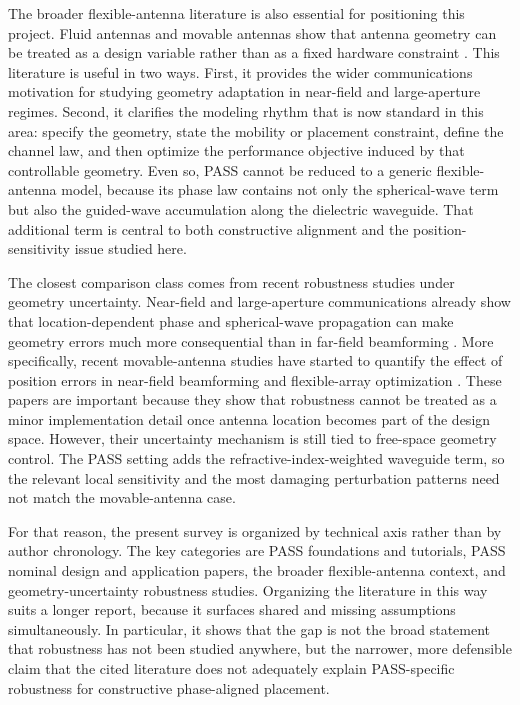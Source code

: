 The broader flexible-antenna literature is also essential for positioning this project. Fluid antennas and movable antennas show that antenna geometry can be treated as a design variable rather than as a fixed hardware constraint \cite{wong2021fluid,zhu2024movable,new2025tutorial,zhu2025tutorialma}. This literature is useful in two ways. First, it provides the wider communications motivation for studying geometry adaptation in near-field and large-aperture regimes. Second, it clarifies the modeling rhythm that is now standard in this area: specify the geometry, state the mobility or placement constraint, define the channel law, and then optimize the performance objective induced by that controllable geometry. Even so, PASS cannot be reduced to a generic flexible-antenna model, because its phase law contains not only the spherical-wave term but also the guided-wave accumulation along the dielectric waveguide. That additional term is central to both constructive alignment and the position-sensitivity issue studied here.

The closest comparison class comes from recent robustness studies under geometry uncertainty. Near-field and large-aperture communications already show that location-dependent phase and spherical-wave propagation can make geometry errors much more consequential than in far-field beamforming \cite{ouyang2024primer}. More specifically, recent movable-antenna studies have started to quantify the effect of position errors in near-field beamforming and flexible-array optimization \cite{su2025positionerror,yang2026nearfield}. These papers are important because they show that robustness cannot be treated as a minor implementation detail once antenna location becomes part of the design space. However, their uncertainty mechanism is still tied to free-space geometry control. The PASS setting adds the refractive-index-weighted waveguide term, so the relevant local sensitivity and the most damaging perturbation patterns need not match the movable-antenna case.

For that reason, the present survey is organized by technical axis rather than by author chronology. The key categories are PASS foundations and tutorials, PASS nominal design and application papers, the broader flexible-antenna context, and geometry-uncertainty robustness studies. Organizing the literature in this way suits a longer report, because it surfaces shared and missing assumptions simultaneously. In particular, it shows that the gap is not the broad statement that robustness has not been studied anywhere, but the narrower, more defensible claim that the cited literature does not adequately explain PASS-specific robustness for constructive phase-aligned placement.


